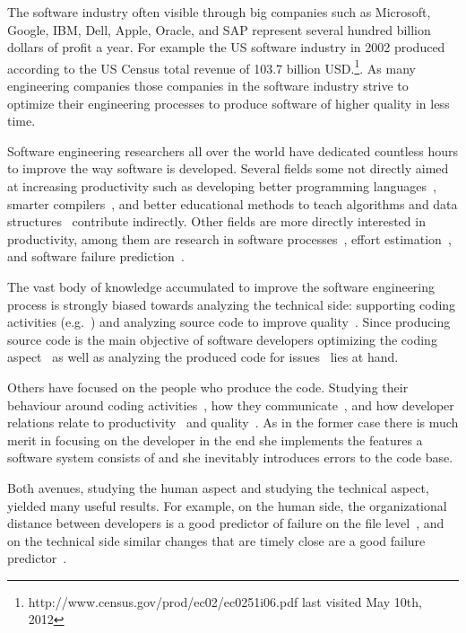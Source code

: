 The software industry often visible through big companies such as Microsoft, Google, IBM, Dell, Apple, Oracle, and SAP represent several hundred billion dollars of profit a year. 
For example the US software industry in 2002 produced according to the US Census total revenue of 103.7 billion USD.\footnote{http://www.census.gov/prod/ec02/ec0251i06.pdf last visited May 10th, 2012}.
As many engineering companies those companies in the software industry strive to optimize their engineering processes to produce software of higher quality in less time.

Software engineering researchers all over the world have dedicated countless hours to improve the way software is developed.
Several fields some not directly aimed at increasing productivity such as developing better programming languages~\cite{conf:prog:lang}, smarter compilers~\cite{cong:comp:constr}, and better educational methods to teach algorithms and data structures~\cite{conf:sigcse} contribute indirectly.
Other fields are more directly interested in productivity, among them are research in software processes~\cite{conf:icssp}, effort estimation~\cite{molkken:isese:2003,boehm:analse:2000}, and software failure prediction~\cite{conf:promise}.

The vast body of knowledge accumulated to improve the software engineering process is strongly biased towards analyzing the technical side: supporting coding activities (e.g.~\cite{bassil:iwpc:2001,mens:tse:2004}) and analyzing source code to improve quality~\cite{zimmermann:oopsla:2005,nagappan:icse:2006}. 
Since producing source code is the main objective of software developers optimizing the coding aspect~\cite{bassil:iwpc:2001,mens:tse:2004} as well as analyzing the produced code for issues~\cite{nagappan:icse:2005,schroeter:isese:2006} lies at hand.

Others have focused on the people who produce the code. Studying their behaviour around coding activities~\cite{latoza:icse:2006}, how they communicate~\cite{ko:icse:2007,gopal:2002:comacm}, and how developer relations relate to productivity~\cite{gopal:2002:comacm} and quality~\cite{abreu:iwpse:2009,wolf:icse:2009}.
As in the former case there is much merit in focusing on the developer in the end she implements the features a software system consists of and she inevitably introduces errors to the code base.

Both avenues, studying the human aspect and studying the technical aspect, yielded many useful results.
For example, on the human side, the organizational distance between developers is a good predictor of failure on the file level~\cite{nagappan:icse:2008}, and on the technical side similar changes that are timely close are a good failure predictor~\cite{kim:icse:2007}.

